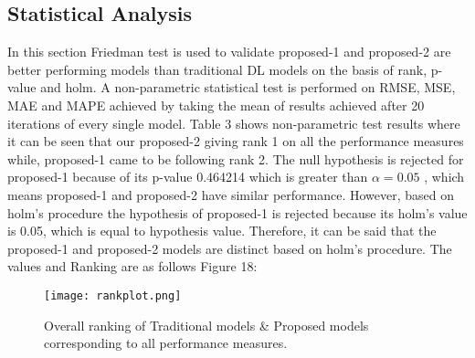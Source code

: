 \subsection{Statistical Analysis}

In this section Friedman test is used to validate proposed-1 and proposed-2  are better performing models than traditional DL models on the basis of rank,  p-value and holm. A non-parametric statistical test is performed on RMSE,  MSE,  MAE and MAPE achieved by taking the mean of results achieved after 20 iterations of every single model. Table 3 shows non-parametric test results where it can be seen that our proposed-2 giving rank 1 on all the performance measures while,  proposed-1 came to be following rank 2. The null hypothesis is rejected for proposed-1 because of its p-value 0.464214 which is greater than  $\alpha = 0.05$ , 
 which means proposed-1 and proposed-2 have similar performance. However,  based on holm’s procedure the hypothesis of proposed-1 is rejected because its holm’s value is 0.05,  which is equal to hypothesis value. Therefore,  it can be said that the proposed-1 and proposed-2 models are distinct based on holm’s procedure. The values and Ranking are as follows Figure 18:

\begin{figure*}[ht!]
  \centering
   \texttt{[image: rankplot.png]}
   \caption{Overall ranking of Traditional models \& Proposed models corresponding to all performance measures.}
 \end{figure*}

